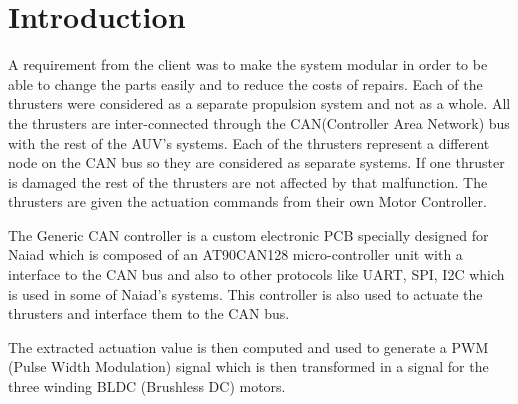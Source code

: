 \section{Introduction}\label{sec:introduction}
A requirement from the client was to make the system modular in order to be able to change the parts easily and to reduce the costs of repairs. Each of the thrusters were  considered as a separate propulsion system and not as a whole. All the thrusters are inter-connected through the CAN(Controller Area Network) bus with the rest of the AUV's systems. Each of the thrusters represent a different node on the CAN bus so they are considered as separate systems. If one thruster is damaged the rest of the thrusters are not affected by that malfunction. The thrusters are given the actuation commands from their own Motor Controller. 

The Generic CAN controller is a custom electronic PCB specially designed for Naiad which is composed of an AT90CAN128 micro-controller unit with a interface to the CAN bus and also to other protocols like UART, SPI, I2C which is used in some of Naiad's systems. This controller is also used to actuate the thrusters and  interface them to the CAN bus.  

The extracted actuation value is then computed and used to generate a PWM (Pulse Width Modulation) signal which is then transformed in a signal for the three winding BLDC (Brushless DC) motors. 


